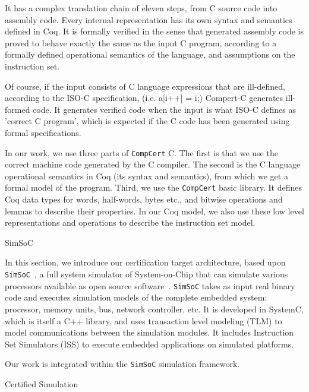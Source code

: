\documentclass[twocolumn]{article}
\makeatletter
\def\section{\@startsection {section}{1}{\z@}{20pt plus 2pt minus 2pt}
{8pt plus 2pt minus 2pt}{\centering\normalsize\sc
\edef\@svsec{\thesection.\ }}}
\def\thesection{\Roman{section}}
\def\subsection{\@startsection {subsection}{2}{\z@}{16pt plus 2pt minus 2pt}
{6pt plus 2pt minus 2pt}{\normalsize\sl
\edef\@svsec{\thesubsection.\ }}}
\def\thesubsection{\Alph{subsection}}
\newcommand{\compcert}{\texttt{CompCert}\xspace}
\newcommand{\simsoc}{\texttt{SimSoC}\xspace}
\makeatother
\begin{document}
It has a complex translation chain of eleven steps, from C source code
into assembly code. Every internal representation has its own syntax
and semantics defined in Coq. It is formally verified in the sense
that generated assembly code is proved to behave exactly the
same as the input C program, according to a formally defined
operational semantics of the language, and assumptions on the
instruction set.

Of course, if the input consists of C language expressions that are
ill-defined, according to the ISO-C specification, (i.e.  a[i++] = i;)
Compert-C generates ill-formed code. It generates verified code when
the input is what ISO-C defines as 'correct C program', which is expected
if the C code has been generated using formal specifications.

In our work, we use three parts of \compcert C.  The first is that we
use the correct machine code generated by the C compiler.  The second
is the C language operational semantics in Coq (its syntax and
semantics), from which we get a formal model of the program.  Third,
we use the \compcert basic library. It defines Coq data types for words,
half-words, bytes etc., and bitwise operations and lemmas to describe
their properties.  In our Coq model, we also use these low level
representations and operations to describe the instruction set model.

\subsection{SimSoC}

In this section, we introduce our certification target architecture,
based upon \simsoc~\cite{simsoc-llvm-2011}, a full system
simulator of System-on-Chip that can simulate various processors
available as open source software~\cite{simsoc-distrib}.  \simsoc
takes as input real binary code and executes simulation models of the
complete embedded system: processor, memory units, bus, network
controller, etc. It is developed in SystemC, which is itself a
C++ library, and uses transaction level modeling (TLM) to model
communications between the simulation modules. It includes Instruction
Set Simulators (ISS) to execute embedded applications on simulated
platforms.

Our work is integrated within the \simsoc simulation framework.


\section{Certified Simulation}
\label{method}
\end{document}
